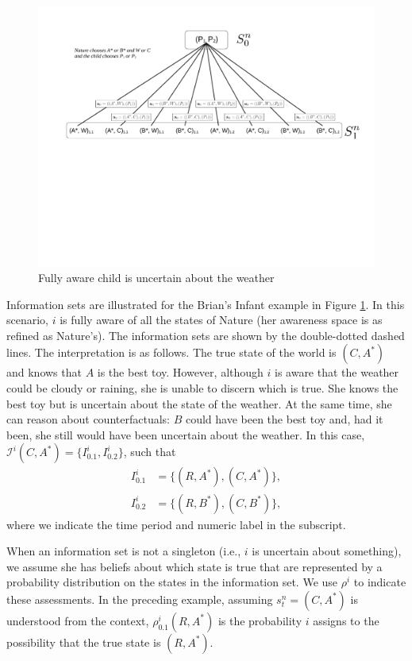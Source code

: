 \documentclass[
11pt,
titlepage,
reqno,
]{article}%
\theoremstyle{definition}
\begin{document}
	\begin{figure}[h!]
		\centering
		\includegraphics*[page=5,trim = 0in 3.5in .8in 0in,scale=.6]{Awareness_Diagrams_All}
		\caption{Fully aware child is uncertain about the weather\label{Diag: p-05}}%
	\end{figure}
	
	Information sets are illustrated for the Brian's Infant example in Figure \ref{Diag: p-05}. 
	In this scenario, $i$ is fully aware of all the states of Nature (her awareness space is as refined as Nature's). The information sets are shown by the double-dotted dashed lines. 
	The interpretation is as follows. 
	The true state of the world is $(C,A^\ast)$ and knows that $A$ is the best toy. 
	However, although $i$ is aware that the weather could be cloudy or raining, she is unable to discern which is true. 
	She knows the best toy but is uncertain about the state of the weather. 
	At the same time, she can reason about counterfactuals: $B$ could have been the best toy and, had it been, she still would have been uncertain about the weather. 
	In this case, $\mathcal{I}^i(C,A^\ast)=\{I^i_{0.1},I^i_{0.2}\}$, such that
	\begin{align*}
		I^i_{0.1}&=\{(R,A^\ast),(C,A^\ast)\},\\
		I^i_{0.2}&=\{(R,B^\ast),(C,B^\ast)\},
	\end{align*}
	where we indicate  the time period and numeric label in the subscript.
	
	When an information set is not a singleton (i.e., $i$ is uncertain about something), we assume she has beliefs about which state is true that are represented by a probability distribution on the states in the information set. 
	We use $\rho^i$ to indicate these assessments. 
	In the preceding example, assuming $s^n_t=(C,A^\ast)$ is understood from the context, $\rho^i_{0.1}(R,A^\ast)$ is the probability $i$ assigns to the possibility that the true state is $(R,A^\ast)$.
\end{document}
